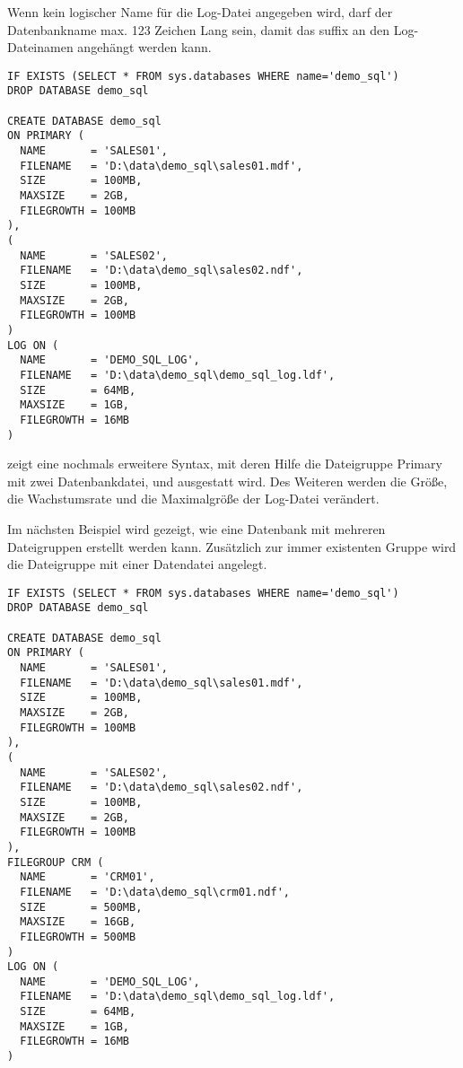         \begin{merke}
          Wenn kein logischer Name für die Log-Datei angegeben wird, darf der
          Datenbankname max. 123 Zeichen Lang sein, damit das suffix
           an den Log-Dateinamen angehängt werden kann.
        \end{merke}
        \begin{lstlisting}[language=ms_sql,caption={Eine
        Dateigruppe mit mehreren Dateien ausstatten und die Log-Datei
        verändern},label=admin03_09]
IF EXISTS (SELECT * FROM sys.databases WHERE name='demo_sql')
DROP DATABASE demo_sql

CREATE DATABASE demo_sql
ON PRIMARY (
  NAME       = 'SALES01',
  FILENAME   = 'D:\data\demo_sql\sales01.mdf',
  SIZE       = 100MB,
  MAXSIZE    = 2GB,
  FILEGROWTH = 100MB
),
(
  NAME       = 'SALES02',
  FILENAME   = 'D:\data\demo_sql\sales02.ndf',
  SIZE       = 100MB,
  MAXSIZE    = 2GB,
  FILEGROWTH = 100MB
)
LOG ON (
  NAME       = 'DEMO_SQL_LOG',
  FILENAME   = 'D:\data\demo_sql\demo_sql_log.ldf',
  SIZE       = 64MB,
  MAXSIZE    = 1GB,
  FILEGROWTH = 16MB
)
      \end{lstlisting}
       zeigt eine nochmals erweitere Syntax, mit deren
      Hilfe die Dateigruppe Primary mit zwei Datenbankdatei,
       und  ausgestatt wird.
      Des Weiteren werden die Größe, die Wachstumsrate und die Maximalgröße der
      Log-Datei verändert.
      
      Im nächsten Beispiel wird gezeigt, wie eine Datenbank mit mehreren Dateigruppen
      erstellt werden kann. Zusätzlich zur immer existenten Gruppe
       wird die Dateigruppe  mit einer
      Datendatei angelegt.
\clearpage      
      \begin{lstlisting}[language=ms_sql,caption={Eine
        Dateigruppe mit mehreren Dateigruppen ausstatten und die Log-Datei
        verändern},label=admin03_10]
IF EXISTS (SELECT * FROM sys.databases WHERE name='demo_sql')
DROP DATABASE demo_sql

CREATE DATABASE demo_sql
ON PRIMARY (
  NAME       = 'SALES01',
  FILENAME   = 'D:\data\demo_sql\sales01.mdf',
  SIZE       = 100MB,
  MAXSIZE    = 2GB,
  FILEGROWTH = 100MB
),
(
  NAME       = 'SALES02',
  FILENAME   = 'D:\data\demo_sql\sales02.ndf',
  SIZE       = 100MB,
  MAXSIZE    = 2GB,
  FILEGROWTH = 100MB
),
FILEGROUP CRM (
  NAME       = 'CRM01',
  FILENAME   = 'D:\data\demo_sql\crm01.ndf',
  SIZE       = 500MB,
  MAXSIZE    = 16GB,
  FILEGROWTH = 500MB
)
LOG ON (
  NAME       = 'DEMO_SQL_LOG',
  FILENAME   = 'D:\data\demo_sql\demo_sql_log.ldf',
  SIZE       = 64MB,
  MAXSIZE    = 1GB,
  FILEGROWTH = 16MB
)
      \end{lstlisting}
      \begin{literaturinternet}
        \item \cite{ms176061}
      \end{literaturinternet}
